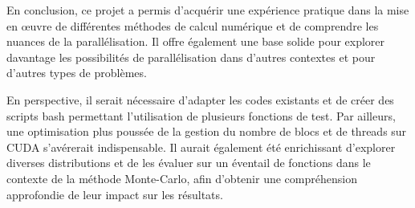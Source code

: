 \documentclass[10pt,a4paper]{article}
\begin{document}
En conclusion, ce projet a permis d'acquérir une expérience pratique dans la mise en œuvre de différentes méthodes de calcul numérique et de comprendre les nuances de la parallélisation. Il offre également une base solide pour explorer davantage les possibilités de parallélisation dans d'autres contextes et pour d'autres types de problèmes.

En perspective, il serait nécessaire d'adapter les codes existants et de créer des scripts bash permettant l'utilisation de plusieurs fonctions de test. Par ailleurs, une optimisation plus poussée de la gestion du nombre de blocs et de threads sur CUDA s'avérerait indispensable. Il aurait également été enrichissant d'explorer diverses distributions et de les évaluer sur un éventail de fonctions dans le contexte de la méthode Monte-Carlo, afin d'obtenir une compréhension approfondie de leur impact sur les résultats.
\end{document}
